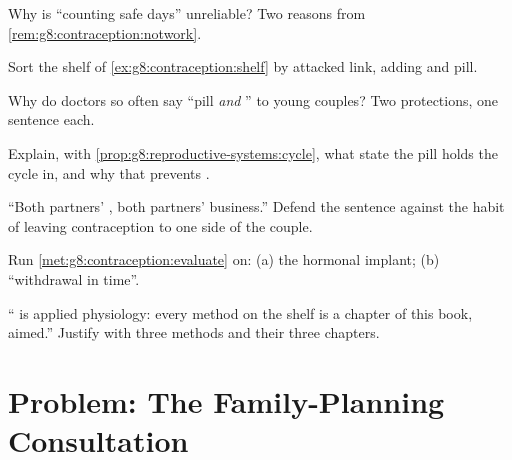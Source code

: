 \begin{exercise}[$\star$]\label{exo:g8:contraception:6}
Why is ``counting safe days'' unreliable? Two reasons
from \cref{rem:g8:contraception:notwork}.
\end{exercise}

\begin{exercise}[$\star\star$]\label{exo:g8:contraception:7}
Sort the shelf of \cref{ex:g8:contraception:shelf} by
attacked link, adding  and pill.
\end{exercise}

\begin{exercise}[$\star\star$]\label{exo:g8:contraception:8}
Why do doctors so often say ``pill \emph{and} ''
to young couples? Two protections, one sentence each.
\end{exercise}

\begin{exercise}[$\star\star$]\label{exo:g8:contraception:9}
Explain, with
\cref{prop:g8:reproductive-systems:cycle}, what state
the pill holds the cycle in, and why that prevents
.
\end{exercise}

\begin{exercise}[$\star\star$]\label{exo:g8:contraception:10}
``Both partners' , both partners' business.''
Defend the sentence against the habit of leaving
contraception to one side of the couple.
\end{exercise}

\begin{exercise}[$\star\star$]\label{exo:g8:contraception:11}
Run \cref{met:g8:contraception:evaluate} on: (a) the
hormonal implant; (b) ``withdrawal in time''.
\end{exercise}

\begin{exercise}[$\star\star\star$]\label{exo:g8:contraception:12}
`` is applied physiology: every method on
the shelf is a chapter of this book, aimed.'' Justify
with three methods and their three chapters.
\end{exercise}

\section{Problem: The Family-Planning Consultation}

